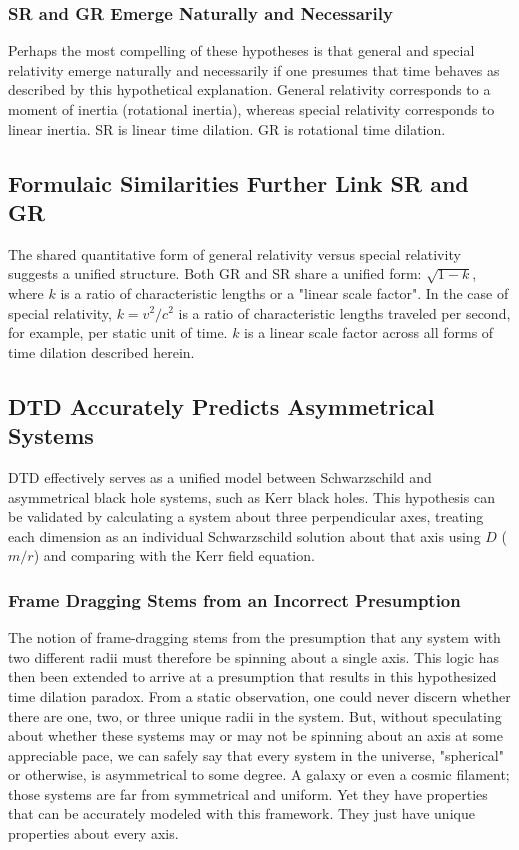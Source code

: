 \documentclass[twoside,twocolumn,9pt,fleqn]{article}
\begin{document}
\subsubsection{SR and GR Emerge Naturally and Necessarily}
Perhaps the most compelling of these hypotheses is that general and special relativity emerge naturally and necessarily if one presumes that time behaves as described by this hypothetical explanation. General relativity corresponds to a moment of inertia (rotational inertia), whereas special relativity corresponds to linear inertia. SR is linear time dilation. GR is rotational time dilation.

\subsection{Formulaic Similarities Further Link SR and GR}
The shared quantitative form of general relativity versus special relativity suggests a unified structure. Both GR and SR share a unified form: $\sqrt{1-k}$, where $k$ is a ratio of characteristic lengths or a "linear scale factor". In the case of special relativity, $k = v^2/c^2$ is a ratio of characteristic lengths traveled per second, for example, per static unit of time. $k$ is a linear scale factor across all forms of time dilation described herein.

\subsection{DTD Accurately Predicts Asymmetrical Systems}
DTD effectively serves as a unified model between Schwarzschild and asymmetrical black hole systems, such as Kerr black holes. This hypothesis can be validated by calculating a system about three perpendicular axes, treating each dimension as an individual Schwarzschild solution about that axis using $D$ ($m/r$) and comparing with the Kerr field equation. 

\subsubsection{Frame Dragging Stems from an Incorrect Presumption}
The notion of frame-dragging stems from the presumption that any system with two different radii must therefore be spinning about a single axis. This logic has then been extended to arrive at a presumption that results in this hypothesized time dilation paradox. From a static observation, one could never discern whether there are one, two, or three unique radii in the system. But, without speculating about whether these systems may or may not be spinning about an axis at some appreciable pace, we can safely say that every system in the universe, "spherical" or otherwise, is asymmetrical to some degree. A galaxy or even a cosmic filament; those systems are far from symmetrical and uniform. Yet they have properties that can be accurately modeled with this framework. They just have unique properties about every axis. 
\end{document}
